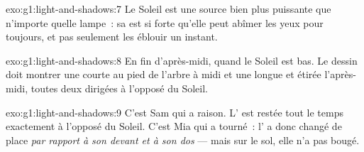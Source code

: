 \begin{solution}{exo:g1:light-and-shadows:7}
Le Soleil est une source bien plus puissante que n'importe quelle
lampe~: sa  est si forte qu'elle peut abîmer les yeux pour
toujours, et pas seulement les éblouir un instant.
\end{solution}

\begin{solution}{exo:g1:light-and-shadows:8}
En fin d'après-midi, quand le Soleil est bas. Le dessin doit montrer
une  courte au pied de l'arbre à midi et une  longue et
étirée l'après-midi, toutes deux dirigées à l'opposé du Soleil.
\end{solution}

\begin{solution}{exo:g1:light-and-shadows:9}
C'est Sam qui a raison. L' est restée tout le temps exactement à
l'opposé du Soleil. C'est Mia qui a tourné~: l' a donc changé de
place \emph{par rapport à son devant et à son dos} --- mais sur le
sol, elle n'a pas bougé.
\end{solution}
